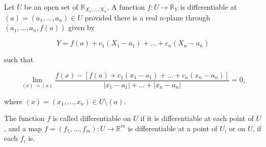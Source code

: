 Let $U$ be an open set of $\mathbb{R}_{X_1, \ldots, X_n}$. A function $f: U \to \mathbb{R}_Y$ is differentiable at $(a) = (a_1, \ldots, a_n) \in U$ provided there is a real $n$-plane through $(a_1, \ldots, a_n, f(a))$ given by

$$Y = f(a) + c_1(X_1 - a_1) + \ldots + c_n(X_n - a_n)$$

such that

$$\lim_{(x) \to (a)} \frac{f(x) - [f(a) + c_1(x_1 - a_1) + \ldots + c_n(x_n - a_n)]}{|x_1 - a_1| + \ldots + |x_n - a_n|} = 0,$$

where $(x) = (x_1, \ldots, x_n) \in U \setminus (a)$.

The function $f$ is called differentiable on $U$ if it is differentiable at each point of $U$, and a map $f = (f_1, \ldots, f_m): U \to \mathbb{R}^m$ is differentiable at a point of $U$, or on $U$, if each $f_i$ is.
